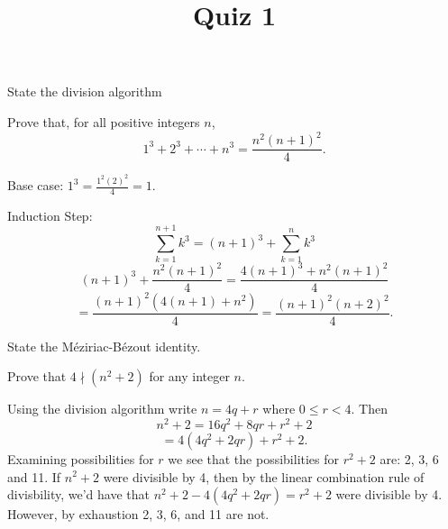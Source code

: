 \documentclass{exam}
\title{Quiz 1}
\begin{document}
\maketitle

\begin{questions}
  \question[5] State the division algorithm

  \question[5] Prove that, for all positive integers $n$,
  $$1^3 + 2^3 + \cdots + n^3 = \frac{n^2(n+1)^2}{4}.$$
  \begin{solution}
    Base case: $1^3 = \frac{1^2(2)^2}{4} = 1$.

    Induction Step: 
    $$\sum_{k=1}^{n+1} k^3 = (n+1)^3 + \sum_{k=1}^n k^3$$
    $$  (n+1)^3 + \frac{n^2(n+1)^2}{4}
    = \frac{ 4(n+1)^3 + n^2(n+1)^2 }{4}$$
    $$ = \frac{ (n+1)^2 ( 4(n+1) + n^2 ) }{4}
    = \frac{ (n+1)^2 (n+2)^2 }{4}.$$        
  \end{solution}


  \question[5]  State the M\'eziriac-B\'ezout identity.

    \question[8] Prove that $4 \nmid (n^2 + 2)$ for any integer $n$.
    \begin{solution}
        Using the division algorithm write $n = 4q + r$ where $0 \le r
        < 4.$ Then 
        $$n^2 + 2 = 16q^2 + 8qr + r^2 + 2$$
        $$ = 4(4q^2 + 2qr) + r^2 + 2.$$
        Examining possibilities for $r$ we see that the possibilities
        for $r^2 + 2$ are: 2, 3, 6 and 11. If $n^2 + 2$ were divisible
        by 4, then by the linear combination rule of divisbility, we'd
        have that $n^2 +2 - 4(4q^2 + 2qr) = r^2 + 2$ were divisible by
        4. However, by exhaustion 2, 3, 6, and 11 are not. 
    \end{solution}


\end{questions}
\end{document}
